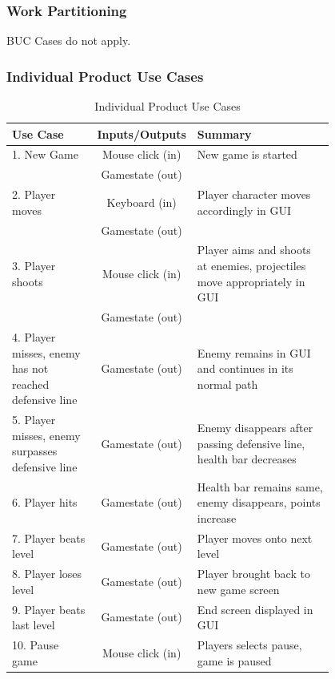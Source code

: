 \documentclass[12pt, titlepage]{article}
\begin{document}
\subsubsection{Work Partitioning}
BUC Cases do not apply.

\subsubsection{Individual Product Use Cases}
\begin{table}[H]
    \caption{Individual Product Use Cases} 
    \begin{center}
       \begin{tabular}{p{0.3\linewidth} | c | p{0.5\linewidth}}
        \textbf{Use Case} & \textbf{Inputs/Outputs} & \textbf{Summary} \\
        \hline
        1. New Game & Mouse click (in) & New game is started \\
                    & Gamestate (out)  &\\
        \hline
        2. Player moves & Keyboard (in) & Player character moves accordingly in GUI \\
                        & Gamestate (out) & \\
        \hline
        3. Player shoots & Mouse click (in) & Player aims and shoots at enemies, projectiles move appropriately in GUI \\
                         & Gamestate (out) &\\
        \hline
        4. Player misses, enemy has not reached defensive line & Gamestate (out) & Enemy remains in GUI and continues in its normal path\\
        \hline
        5. Player misses, enemy surpasses defensive line & Gamestate (out) & Enemy disappears after passing defensive line, health bar decreases \\
        \hline
        6. Player hits & Gamestate (out) & Health bar remains same, enemy disappears, points increase \\
        \hline
        7. Player beats level & Gamestate (out) & Player moves onto next level \\
        \hline
        8. Player loses level & Gamestate (out) & Player brought back to new game screen \\
        \hline
        9. Player beats last level & Gamestate (out) & End screen displayed in GUI \\
        \hline
        10. Pause game & Mouse click (in) & Players selects pause, game is paused \\

\end{tabular}
\end{center}
\end{table}
\end{document}
